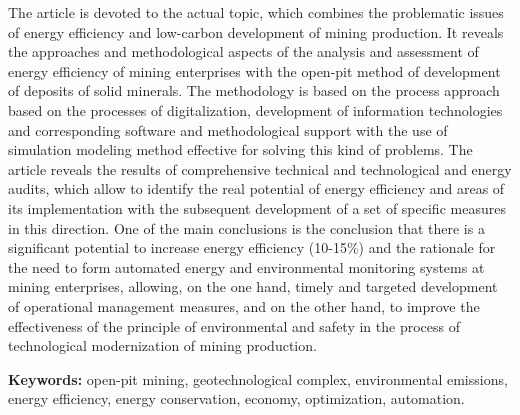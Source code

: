 The article is devoted to the actual topic, which combines the
problematic issues of energy efficiency and low-carbon development of
mining production. It reveals the approaches and methodological aspects
of the analysis and assessment of energy efficiency of mining
enterprises with the open-pit method of development of deposits of solid
minerals. The methodology is based on the process approach based on the
processes of digitalization, development of information technologies and
corresponding software and methodological support with the use of
simulation modeling method effective for solving this kind of problems.
The article reveals the results of comprehensive technical and
technological and energy audits, which allow to identify the real
potential of energy efficiency and areas of its implementation with the
subsequent development of a set of specific measures in this direction.
One of the main conclusions is the conclusion that there is a
significant potential to increase energy efficiency (10-15\%) and the
rationale for the need to form automated energy and environmental
monitoring systems at mining enterprises, allowing, on the one hand,
timely and targeted development of operational management measures, and
on the other hand, to improve the effectiveness of the principle of
environmental and safety in the process of technological modernization
of mining production.

{\bfseries Keywords:} open-pit mining, geotechnological complex,
environmental emissions, energy efficiency, energy conservation,
economy, optimization, automation.

